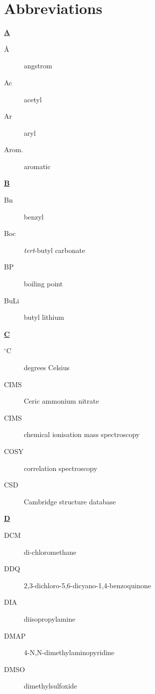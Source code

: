 \setcounter{secnumdepth}{-2}

\chapter{Abbreviations}

\begin{multicols}{2}{
\begin{center}
\textbf{\underline{A}}
\end{center}
\begin{description}
\item[\AA]  angstrom 
\item[Ac]   acetyl 
\item[Ar]   aryl 
\item[Arom.] aromatic
\end{description}

\begin{center}
\textbf{\underline{B}}
\end{center}
\begin{description}
\item[Bn]   benzyl 
\item[Boc] \textit{tert}-butyl carbonate
\item[BP] boiling point
\item[BuLi]  butyl lithium 
\end{description}

\begin{center}
\textbf{\underline{C}}
\end{center}
\begin{description}
\item[$^\circ$C]   degrees Celsius 
\item[CIMS]  Ceric ammonium nitrate
\item[CIMS]  chemical ionisation mass spectroscopy 
\item[COSY]   correlation spectroscopy 
\item[CSD]   Cambridge structure database\cite{CSDUM:78}
\end{description}

\begin{center}
\textbf{\underline{D}}
\end{center}
\begin{description} 
\item[DCM]   di-chloromethane 
\item[DDQ]   2,3-dichloro-5,6-dicyano-1,4-benzoquinone
\item[DIA]  diisopropylamine
\item[DMAP] 4-N,N-dimethylaminopyridine 
\item[DMSO]  dimethylsulfoxide 
\end{description}

}
\end{multicols}
